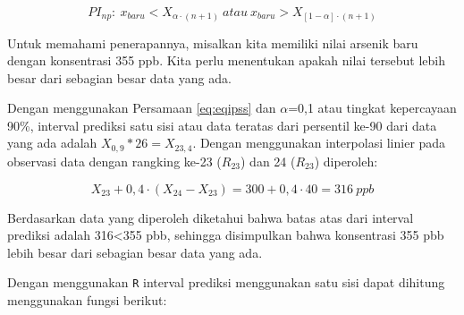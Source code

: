 \documentclass[]{book}
\begin{document}
\begin{equation}
  PI_{np}:\ x_{baru}<X_{\alpha\cdot\left(n+1\right)}\ atau\ x_{baru}>X_{\left[1-\alpha\right]\cdot\left(n+1\right)}
  \label{eq:eqipss}
\end{equation}

Untuk memahami penerapannya, misalkan kita memiliki nilai arsenik baru
dengan konsentrasi 355 ppb. Kita perlu menentukan apakah nilai tersebut
lebih besar dari sebagian besar data yang ada.

Dengan menggunakan Persamaan \eqref{eq:eqipss} dan \(\alpha\)=0,1 atau
tingkat kepercayaan 90\%, interval prediksi satu sisi atau data teratas
dari persentil ke-90 dari data yang ada adalah \(X_{0,9}*26=X_{23,4}\).
Dengan menggunakan interpolasi linier pada observasi data dengan
rangking ke-23 (\(R_{23}\)) dan 24 (\(R_{23}\)) diperoleh:

\[
  X_{23}+0,4\cdot\left(X_{24}-X_{23}\right)=300+0,4\cdot40=316\ ppb
\]

Berdasarkan data yang diperoleh diketahui bahwa batas atas dari interval
prediksi adalah 316\textless{}355 pbb, sehingga disimpulkan bahwa
konsentrasi 355 pbb lebih besar dari sebagian besar data yang ada.

Dengan menggunakan \texttt{R} interval prediksi menggunakan satu sisi
dapat dihitung menggunakan fungsi berikut:
\end{document}
